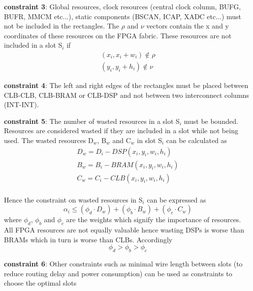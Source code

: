\documentclass[11pt]{article}
\theoremstyle{definition}
\begin{document}
\textbf{constraint 3}: Global resources, clock resources (central clock column, BUFG, BUFR, MMCM etc...), static components (BSCAN, ICAP, XADC etc...) must not be included in the rectangles. The $\rho$ and $\nu$ vectors contain the x and y coordinates of these resources on the FPGA fabric. These resources are not included in a slot S$_i$ if 
\begin{equation}
\begin{split}
(x_i, x_i+w_i) \notin \rho \\
(y_i, y_i+h_i) \notin \nu
\end{split}
\end{equation}

\textbf{constraint 4}: The left and right edges of the rectangles must be placed between CLB-CLB, CLB-BRAM or CLB-DSP and not between two interconnect columns (INT-INT).

\textbf{constraint 5}: The number of wasted resources in a slot S$_i$ must be bounded. Resources are considered wasted if they are included in a slot while not being used.  The wasted resources D$_{w}$, B$_w$ and C$_w$ in slot S$_i$ can be calculated as
\begin{equation}
\begin{split}
D_w = D_i - DSP(x_i, y_i, w_i, h_i) \\
B_w = B_i - BRAM(x_i, y_i, w_i, h_i) \\
C_w = C_i - CLB(x_i, y_i, w_i, h_i) \\ 
\end{split}
\end{equation}

Hence the constraint on wasted resources in S$_i$ can be expressed as 
\begin{equation}
\alpha_i \leq (\phi_d \cdot D_w) + (\phi_b \cdot B_w) + (\phi_c \cdot C_w)
\end{equation}
where $\phi_d$, $\phi_b$ and $\phi_c$ are the weights which signify the importance of resources. All FPGA resources are not equally valuable hence wasting DSPs is worse than BRAMs which in turn is worse than CLBs. Accordingly 
\begin{equation}
\phi_d > \phi_b > \phi_c
\end{equation}

\textbf{constraint 6}: Other constraints such as minimal wire length between slots (to reduce routing delay and power consumption) can be used as constraints to choose the optimal slots \\
\end{document}
